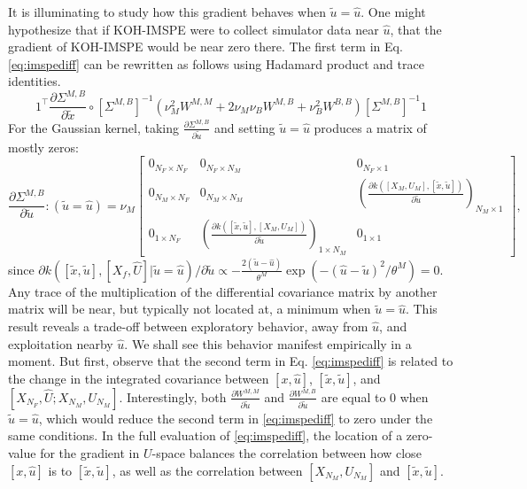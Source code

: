 \documentclass[
]{article}
\begin{document}
It is illuminating to study how this gradient behaves when \(\tilde{u} = \hat{u}\). One might hypothesize that if KOH-IMSPE were to collect simulator data near \(\hat{u}\), that the gradient of KOH-IMSPE would be near zero there. The first term in Eq. \eqref{eq:imspediff} can be rewritten as follows using Hadamard product and trace identities.
\[
1^\top \frac{\partial \Sigma^{M, B}}{\partial \tilde{x}}\circ [\Sigma^{M, B}]^{-1}\left(\nu_M^2W^{M, M} + 2\nu_M\nu_B W^{M, B} + \nu_B^2 W^{B,B} \right)[\Sigma^{M, B}]^{-1}1
\label{eq:imspediffone}
\]
For the Gaussian kernel, taking \(\frac{\partial \Sigma^{M,B}}{\partial \tilde{u}}\) and setting \(\tilde{u} = \hat{u}\) produces a matrix of mostly zeros:
\begin{equation}
\frac{\partial \Sigma^{M,B}}{\partial \tilde{u}}:(\tilde{u} = \hat{u}) = \nu_M \begin{bmatrix}
0_{N_F \times N_F} & 0_{N_F \times N_M} & 0_{N_F \times 1}\\
0_{N_M \times N_F} & 0_{N_M \times N_M} & \left(\frac{\partial k([X_M,U_M], [\tilde{x}, \tilde{u}]) }{\partial \tilde{u}}\right)_{N_M \times 1}\\
0_{1 \times N_F} & \left(\frac{\partial k([\tilde{x}, \tilde{u}], [X_M, U_M])}{\partial \tilde{u}}\right)_{1\times N_M} & 0_{1\times 1}
\end{bmatrix},
\label{eq:dkdutilde}
\end{equation}
since \(\partial k([\tilde{x}, \tilde{u}],[X_f, \hat{U}]| \tilde{u} = \hat{u})/\partial \tilde{u} \propto -\frac{2(\tilde{u}-\hat{u})}{\theta^M}\exp\left(-(\hat{u}-\tilde{u})^2/\theta^M\right) = 0\). Any trace of the multiplication of the differential covariance matrix by another matrix will be near, but typically not located at, a minimum when \(\tilde{u}=\hat{u}\). This result reveals a trade-off between exploratory behavior, away from \(\hat{u}\), and exploitation nearby \(\hat{u}\). We shall see this behavior manifest empirically in a moment. But first, observe that the second term in Eq. \eqref{eq:imspediff} is related to the change in the integrated covariance between \([x, \hat{u}]\), \([\tilde{x}, \tilde{u}]\), and \([X_{N_F}, \hat{U}; X_{N_M}, U_{N_M}]\). Interestingly, both \(\frac{\partial W^{M,M}}{\partial \tilde{u}}\) and \(\frac{\partial W^{M,B}}{\partial \tilde{u}}\) are equal to 0 when \(\tilde{u} = \hat{u}\), which would reduce the second term in \eqref{eq:imspediff} to zero under the same conditions. In the full evaluation of \eqref{eq:imspediff}, the location of a zero-value for the gradient in \(U\)-space balances the correlation between how close \([x, \hat{u}]\) is to \([\tilde{x}, \tilde{u}]\), as well as the correlation between \([X_{N_M}, U_{N_M}]\) and \([\tilde{x}, \tilde{u}]\).
\end{document}

